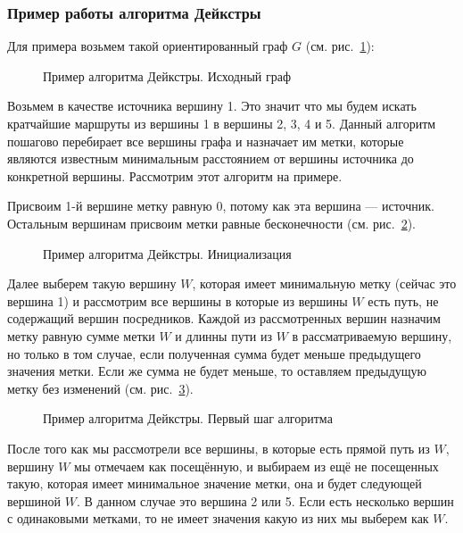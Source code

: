 \subsubsection{Пример работы алгоритма Дейкстры}

Для примера возьмем такой ориентированный граф $G$ (см. рис.~\ref{ris:ad-1}):
\begin{figure}[ht]
\caption{Пример алгоритма Дейкстры. Исходный граф}
\label{ris:ad-1}
\end{figure}

Возьмем в качестве источника вершину 1. 
Это значит что мы будем искать кратчайшие маршруты из вершины 1 в вершины 2, 3, 4 и 5.
Данный алгоритм пошагово перебирает все вершины графа и назначает им метки, которые являются известным минимальным расстоянием от вершины источника до конкретной вершины. 
Рассмотрим этот алгоритм на примере. 

Присвоим 1-й вершине метку равную 0, потому как эта вершина --- источник. 
Остальным вершинам присвоим метки равные бесконечности (см. рис.~\ref{ris:ad-2}).

\begin{figure}[ht]
\caption{Пример алгоритма Дейкстры. Инициализация}
\label{ris:ad-2}
\end{figure}

Далее выберем такую вершину $W$, которая имеет минимальную метку (сейчас это вершина 1) и рассмотрим все вершины в которые из вершины $W$ есть путь, не содержащий вершин посредников. 
Каждой из рассмотренных вершин назначим метку равную сумме метки $W$ и длинны пути из $W$ в рассматриваемую вершину, но только в том случае, если полученная сумма будет меньше предыдущего значения метки. 
Если же сумма не будет меньше, то оставляем предыдущую метку без изменений (см. рис.~\ref{ris:ad-3}).

\begin{figure}[ht]
\caption{Пример алгоритма Дейкстры. Первый шаг алгоритма}
\label{ris:ad-3}
\end{figure}

После того как мы рассмотрели все вершины, в которые есть прямой путь из $W$, вершину $W$ мы отмечаем как посещённую, и выбираем из ещё не посещенных такую, которая имеет минимальное значение метки, она и будет следующей вершиной $W$. 
В данном случае это вершина 2 или 5. 
Если есть несколько вершин с одинаковыми метками, то не имеет значения какую из них мы выберем как $W$.

